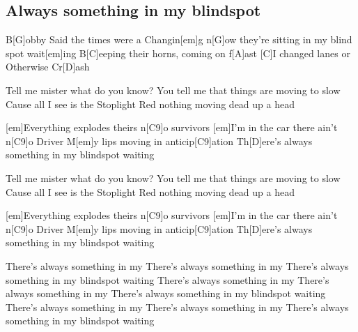 \subsection*{Always something in my blindspot   }
\begin{guitar}
B[G]obby Said the times were a Changin[em]g
n[G]ow they're sitting in my blind spot wait[em]ing
B[C]eeping their horns, coming on f[A]ast
[C]I changed lanes or Otherwise Cr[D]ash



Tell me mister what do you know?
You tell me that things are moving to slow
Cause all I see is the Stoplight Red
nothing moving dead up a head



[em]Everything explodes theirs n[C9]o survivors
[em]I'm in the car there ain't n[C9]o Driver
M[em]y lips moving in anticip[C9]ation
Th[D]ere's always something in my blindspot waiting



Tell me mister what do you know?
You tell me that things are moving to slow
Cause all I see is the Stoplight Red
nothing moving dead up a head



[em]Everything explodes theirs n[C9]o survivors
[em]I'm in the car there ain't n[C9]o Driver
M[em]y lips moving in anticip[C9]ation
Th[D]ere's always something in my blindspot waiting



There's always something in my
There's always something in my
There's always something in my blindspot waiting
There's always something in my
There's always something in my
There's always something in my blindspot waiting
There's always something in my
There's always something in my
There's always something in my blindspot waiting 
\end{guitar}
